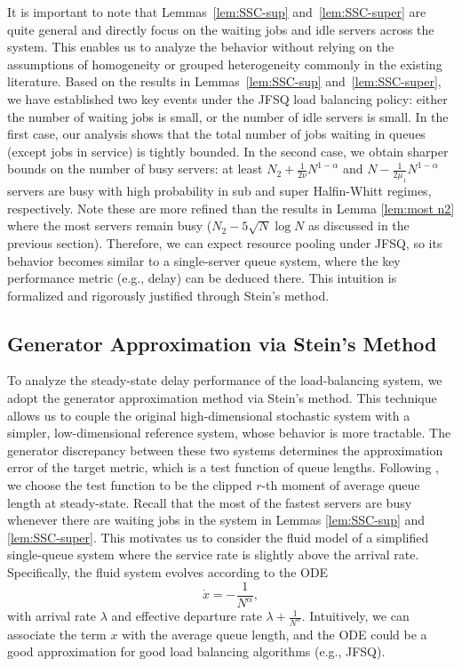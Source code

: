 \documentclass[11pt,oneside,letter]{article}
\begin{document}
It is important to note that Lemmas~\ref{lem:SSC-sup} and~\ref{lem:SSC-super} are quite general and directly focus on the waiting jobs and idle servers across the system. This enables us to analyze the behavior without relying on the assumptions of homogeneity or grouped heterogeneity commonly in the existing literature. 
Based on the results in Lemmas~\ref{lem:SSC-sup} and~\ref{lem:SSC-super}, we have established two key events under the JFSQ load balancing policy: either the number of waiting jobs is small, or the number of idle servers is small. In the first case, our analysis shows that the total number of jobs waiting in queues (except jobs in service) is tightly bounded. In the second case, we obtain sharper bounds on the number of busy servers:  at least $N_2 + \frac{1}{2\nu}N^{1-\alpha}$ and $ N - \frac{1}{2 \mu_1}N^{1-\alpha}$ servers are busy with high probability in sub and super Halfin-Whitt regimes, respectively. 
Note these are more refined than the results in Lemma \ref{lem:most n2} where the most servers remain busy ($N_2 - 5\sqrt{N}\log N$ as discussed in the previous section). Therefore, we can expect resource pooling under JFSQ, so its behavior becomes similar to a single-server queue system, where the key performance metric (e.g., delay) can be deduced there. 
This intuition is formalized and rigorously justified through Stein's method. 

\subsection{Generator Approximation via Stein's Method}
To analyze the steady-state delay performance of the load-balancing system, we adopt the generator approximation method via Stein’s method. This technique allows us to couple the original high-dimensional stochastic system with a simpler, low-dimensional reference system, whose behavior is more tractable. The generator discrepancy between these two systems determines the approximation error of the target metric, which is a test function of queue lengths. Following \cite{LiuYin_20}, we choose the test function to be the clipped $r$-th moment of average queue length at steady-state. Recall that the most of the fastest servers are busy whenever there are waiting jobs in the system  in Lemmas \ref{lem:SSC-sup} and \ref{lem:SSC-super}. This motivates us to consider the fluid model of a simplified single-queue system where the service rate is slightly above the arrival rate. Specifically, the fluid system evolves according to the ODE
\[
\dot{x} = -\frac{1}{N^{\alpha}},
\]
with arrival rate $\lambda$ and effective departure rate $\lambda + \frac{1}{N^\alpha}$. Intuitively, we can associate the term $x$ with the average queue length, and the ODE could be a good approximation for good load balancing algorithms (e.g., JFSQ). 
\end{document}
